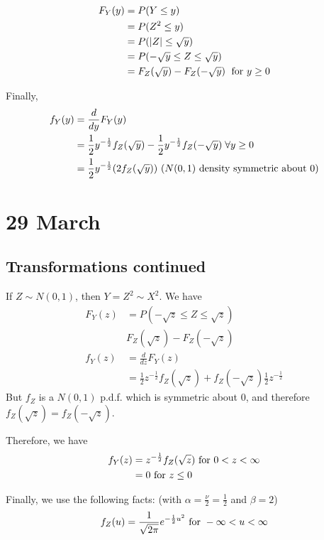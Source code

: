 \documentclass[12pt]{article}
\begin{document}
\begin{align*}
    F_Y (y) &= P(Y \leq y) \\
        &= P(Z^2 \leq y) \\
        &= P(|Z| \leq \sqrt{y}) \\
        &= P(-\sqrt{y} \leq Z \leq \sqrt{y}) \\
        &= F_Z (\sqrt{y}) - F_Z (-\sqrt{y}) \; \textnormal{ for } y \geq 0
\end{align*}

Finally,
\begin{align*}
    f_Y (y) &= \frac{d}{dy} F_Y (y) \\
        &= \frac{1}{2} y^{-\frac{1}{2}} f_Z (\sqrt{y}) - \frac{1}{2} y^{-\frac{1}{2}} f_Z (-\sqrt{y}) \; \forall y \geq 0 \\
        &= \frac{1}{2} y^{-\frac{1}{2}} (2 f_Z (\sqrt{y})) \textnormal{ ($N(0,1)$ density symmetric about 0)}
\end{align*}

\section{29 March}
\subsection{Transformations continued}
If $Z \sim N(0,1)$, then $Y = Z^2 \sim X^2$. We have
\begin{align*}
    F_Y (z) &= P(-\sqrt{z} \leq Z \leq \sqrt{z}) \\
        & F_Z (\sqrt{z}) - F_Z (-\sqrt{z}) \\
    f_Y (z) &= \frac{d}{dz} F_Y (z) \\
        &= \frac{1}{2} z^{-\frac{1}{2}} f_Z (\sqrt{z}) + f_Z (-\sqrt{z}) \frac{1}{2} z^{-\frac{1}{2}}
\end{align*}
But $f_Z$ is a $N(0,1)$ p.d.f. which is symmetric about 0, and therefore $f_Z (\sqrt{z}) = f_Z (-\sqrt{z})$.

Therefore, we have
\begin{align*}
    f_Y (z) &= z^{-\frac{1}{2}} f_Z (\sqrt{z}) \textnormal{ for } 0 < z < \infty \\
        &= 0 \textnormal{ for } z \leq 0
\end{align*}

Finally, we use the following facts: (with $\alpha = \frac{\nu}{2} = \frac{1}{2}$ and $\beta = 2$)
\[
    f_Z (u) = \frac{1}{\sqrt{2\pi}} e^{-\frac{1}{2} u^2} \textnormal{ for } -\infty < u < \infty
\]
\end{document}
